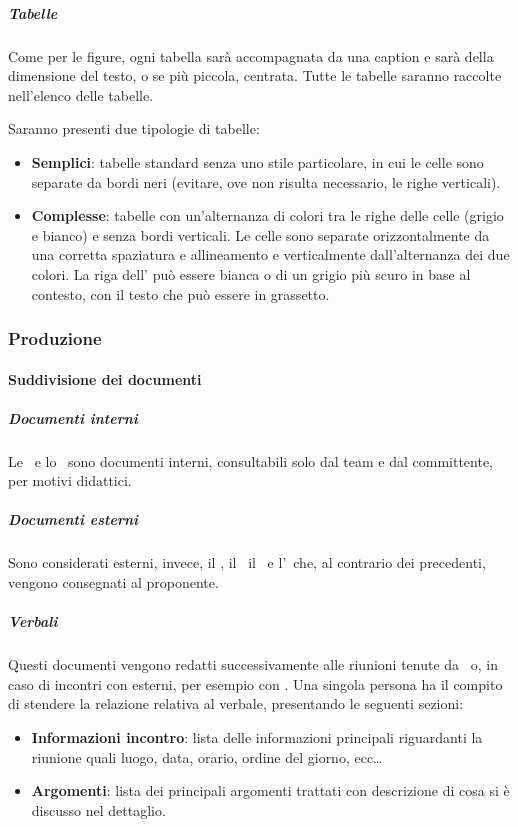 			\subparagraph{Tabelle}
			Come per le figure, ogni tabella sarà accompagnata da una caption e sarà della dimensione del testo, o se più piccola, centrata.
			Tutte le tabelle saranno raccolte nell'elenco delle tabelle.\par
			Saranno presenti due tipologie di tabelle:
			\begin{itemize}
				\item \textbf{Semplici}: tabelle standard senza uno stile particolare, in cui le celle sono separate da bordi neri (evitare, ove non risulta necessario,
					le righe verticali).
				\item \textbf{Complesse}: tabelle con un'alternanza di colori tra le righe delle celle (grigio e bianco) e senza bordi verticali.
					Le celle sono separate orizzontalmente da una corretta spaziatura e allineamento e verticalmente dall'alternanza dei due colori.
					La riga dell' può essere bianca o di un grigio più scuro in base al contesto, con il testo che può essere in grassetto.
			\end{itemize}


		\subsubsection{Produzione}

			\paragraph{Suddivisione dei documenti}

			\subparagraph{Documenti interni}
			Le \NdP\ e lo \SdF\ sono documenti interni, consultabili solo dal team e dal committente, per motivi didattici.

			\subparagraph{Documenti esterni}
			Sono considerati esterni, invece, il \PdP, il \PdQ\, il \Gl\ e l'\AdR\ che, al contrario dei precedenti, vengono consegnati al proponente.



			\subparagraph{Verbali}
			Questi documenti vengono redatti successivamente alle riunioni tenute da \gruppo\
			o, in caso di incontri con  esterni, per esempio con \II. Una singola persona ha il compito di stendere
			la relazione relativa al verbale, presentando le seguenti sezioni:
			\begin{itemize}
				\item \textbf{Informazioni incontro}: lista delle informazioni principali riguardanti la riunione quali luogo, data, orario, ordine del giorno, ecc\dots
				\item \textbf{Argomenti}: lista dei principali argomenti trattati con descrizione di cosa si è discusso nel dettaglio.
			\end{itemize}


